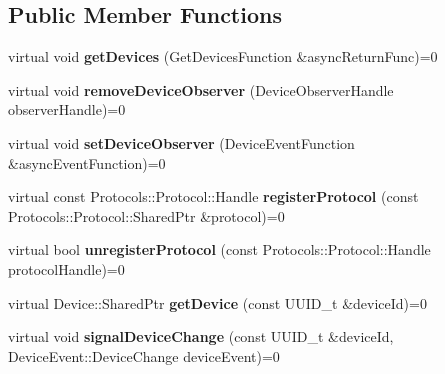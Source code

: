 \subsection*{Public Member Functions}
\begin{DoxyCompactItemize}
\item 
\hypertarget{classIntel_1_1CCFL_1_1API_1_1Model_a636991fabad8025795534e4800101922}{}virtual void {\bfseries get\+Devices} (Get\+Devices\+Function \&async\+Return\+Func)=0\label{classIntel_1_1CCFL_1_1API_1_1Model_a636991fabad8025795534e4800101922}

\item 
\hypertarget{classIntel_1_1CCFL_1_1API_1_1Model_a779ad03099d8997cb06f90b197fcf42c}{}virtual void {\bfseries remove\+Device\+Observer} (Device\+Observer\+Handle observer\+Handle)=0\label{classIntel_1_1CCFL_1_1API_1_1Model_a779ad03099d8997cb06f90b197fcf42c}

\item 
\hypertarget{classIntel_1_1CCFL_1_1API_1_1Model_a59a3be8d0e67d6afae5d29a8831b03f3}{}virtual void {\bfseries set\+Device\+Observer} (Device\+Event\+Function \&async\+Event\+Function)=0\label{classIntel_1_1CCFL_1_1API_1_1Model_a59a3be8d0e67d6afae5d29a8831b03f3}

\item 
\hypertarget{classIntel_1_1CCFL_1_1API_1_1Model_ace328a0d0425cf25681ce71d55b59da0}{}virtual const Protocols\+::\+Protocol\+::\+Handle {\bfseries register\+Protocol} (const Protocols\+::\+Protocol\+::\+Shared\+Ptr \&protocol)=0\label{classIntel_1_1CCFL_1_1API_1_1Model_ace328a0d0425cf25681ce71d55b59da0}

\item 
\hypertarget{classIntel_1_1CCFL_1_1API_1_1Model_a96b9a6a0fc4399a3af0a3b6bca4ff6ec}{}virtual bool {\bfseries unregister\+Protocol} (const Protocols\+::\+Protocol\+::\+Handle protocol\+Handle)=0\label{classIntel_1_1CCFL_1_1API_1_1Model_a96b9a6a0fc4399a3af0a3b6bca4ff6ec}

\item 
\hypertarget{classIntel_1_1CCFL_1_1API_1_1Model_a47632b120a4a83ac98b4c7d723fc396c}{}virtual Device\+::\+Shared\+Ptr {\bfseries get\+Device} (const U\+U\+I\+D\+\_\+t \&device\+Id)=0\label{classIntel_1_1CCFL_1_1API_1_1Model_a47632b120a4a83ac98b4c7d723fc396c}

\item 
\hypertarget{classIntel_1_1CCFL_1_1API_1_1Model_ae1f154dd5945c98537faadbeb8dbc82c}{}virtual void {\bfseries signal\+Device\+Change} (const U\+U\+I\+D\+\_\+t \&device\+Id, Device\+Event\+::\+Device\+Change device\+Event)=0\label{classIntel_1_1CCFL_1_1API_1_1Model_ae1f154dd5945c98537faadbeb8dbc82c}

\end{DoxyCompactItemize}
